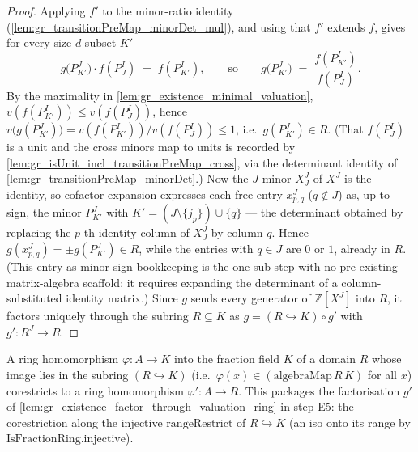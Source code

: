 \begin{proof}
    \leanok
  Applying \(f'\) to the minor-ratio identity
  (\cref{lem:gr_transitionPreMap_minorDet_mul}), and using that \(f'\) extends
  \(f\), gives for every size-\(d\) subset \(K'\)
  \[
    g\bigl(P^J_{K'}\bigr)\cdot f(P^I_J) \;=\; f(P^I_{K'}),
    \qquad\text{so}\qquad
    g\bigl(P^J_{K'}\bigr) \;=\; \frac{f(P^I_{K'})}{f(P^I_J)} .
  \]
  By the maximality in \cref{lem:gr_existence_minimal_valuation},
  \(v(f(P^I_{K'})) \le v(f(P^I_J))\), hence \(v\bigl(g(P^J_{K'})\bigr) =
  v(f(P^I_{K'}))/v(f(P^I_J)) \le 1\), i.e.\ \(g(P^J_{K'}) \in R\). (That
  \(f(P^I_J)\) is a unit and the cross minors map to units is recorded by
  \cref{lem:gr_isUnit_incl_transitionPreMap_cross}, via the determinant identity of
  \cref{lem:gr_transitionPreMap_minorDet}.) Now the \(J\)-minor \(X^J_J\) of \(X^J\)
  is the identity, so cofactor expansion expresses each free entry \(x^J_{p,q}\)
  (\(q \notin J\)) as, up to sign, the minor \(P^J_{K'}\) with \(K' = (J \setminus
  \{j_p\}) \cup \{q\}\) --- the determinant obtained by replacing the \(p\)-th
  identity column of \(X^J_J\) by column \(q\). Hence \(g(x^J_{p,q}) = \pm
  g(P^J_{K'}) \in R\), while the entries with \(q \in J\) are \(0\) or \(1\),
  already in \(R\). (This entry-as-minor sign bookkeeping is the one sub-step with
  no pre-existing matrix-algebra scaffold; it requires expanding the determinant of
  a column-substituted identity matrix.) Since \(g\) sends every generator of
  \(\mathbb{Z}[X^J]\) into \(R\), it factors uniquely through the subring \(R
  \subseteq K\) as \(g = (R \hookrightarrow K) \circ g'\) with \(g' : R^J \to R\).
\end{proof}

\begin{definition}

  \label{def:gr_liftToBaseOfMemRange}
  A ring homomorphism \(\varphi : A \to K\) into the fraction field \(K\) of a domain \(R\) whose
  image lies in the subring \((R \hookrightarrow K)\) (i.e.\ \(\varphi(x) \in (\mathrm{algebraMap}\,R\,K)\)
  for all \(x\)) corestricts to a ring homomorphism \(\varphi' : A \to R\). This packages the
  factorisation \(g'\) of \cref{lem:gr_existence_factor_through_valuation_ring} in step E5: the
  corestriction along the injective \(\mathrm{rangeRestrict}\) of \(R \hookrightarrow K\) (an iso onto
  its range by \(\mathrm{IsFractionRing.injective}\)).
\end{definition}

